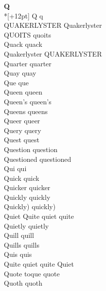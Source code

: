 \vspace{14pt}
\noindent\textbf{\Large Q}\\*[+12pt]
Q q\\
QUAKERLYSTER Quakerlyster\\
QUOITS quoits\\
Quack quack\\
Quakerlyster QUAKERLYSTER\\
Quarter quarter\\
Quay quay\\
Que que\\
Queen queen\\
Queen's queen's\\
Queens queens\\
Queer queer\\
Query query\\
Quest quest\\
Question question\\
Questioned questioned\\
Qui qui\\
Quick quick\\
Quicker quicker\\
Quickly quickly\\
Quickly) quickly)\\
Quiet Quite quiet quite\\
Quietly quietly\\
Quill quill\\
Quills quills\\
Quis quis\\
Quite quiet quite Quiet\\
Quote toque quote\\
Quoth quoth\\

